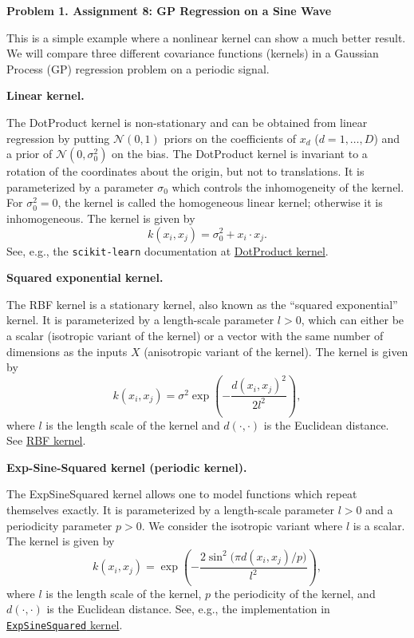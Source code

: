 \documentclass[11pt]{article}
\begin{document}
	
	\noindent\textbf{Problem 1. Assignment 8: GP Regression on a Sine Wave}
	
	This is a simple example where a nonlinear kernel can show a much better result. We will compare three different covariance functions (kernels) in a Gaussian Process (GP) regression problem on a periodic signal.
	
	\medskip
	\noindent\textbf{Linear kernel.}
	
	The DotProduct kernel is non-stationary and can be obtained from linear
	regression by putting $\mathcal{N}(0, 1)$ priors on the coefficients
	of $x_d$ ($d = 1, \dots, D$) and a prior of $\mathcal{N}(0, \sigma_0^2)$
	on the bias. The DotProduct kernel is invariant to a rotation of
	the coordinates about the origin, but not to translations.
	It is parameterized by a parameter $\sigma_0$
	which controls the inhomogeneity of the kernel. For $\sigma_0^2 = 0$,
	the kernel is called the homogeneous linear kernel; otherwise
	it is inhomogeneous. The kernel is given by
	\[
	k(x_i, x_j) = \sigma_0^{2} + x_i \cdot x_j.
	\]
	See, e.g., the \texttt{scikit-learn} documentation at
	\href{https://scikit-learn.org/stable/modules/generated/sklearn.gaussian_process.kernels.DotProduct.html}{DotProduct kernel}.
	
	\medskip
	\noindent\textbf{Squared exponential kernel.}
	
	The RBF kernel is a stationary kernel, also known as the
	``squared exponential'' kernel. It is parameterized by a length-scale
	parameter $l > 0$, which can either be a scalar (isotropic variant of the kernel) or a vector with the same number of dimensions as the inputs
	$X$ (anisotropic variant of the kernel). The kernel is given by
	\[
	k(x_i, x_j)
	= \sigma^2 \exp\!\left(
	- \frac{d(x_i, x_j)^2}{2l^2}
	\right),
	\]
	where $l$ is the length scale of the kernel and $d(\cdot,\cdot)$ is the Euclidean distance.
	See \href{https://scikit-learn.org/stable/modules/generated/sklearn.gaussian_process.kernels.RBF.html}{RBF kernel}.
	
	\medskip
	\noindent\textbf{Exp-Sine-Squared kernel (periodic kernel).}
	
	The ExpSineSquared kernel allows one to model functions which repeat
	themselves exactly. It is parameterized by a length-scale
	parameter $l > 0$ and a periodicity parameter $p > 0$. We consider the isotropic variant where $l$ is a scalar. The kernel is given by
	\[
	k(x_i, x_j)
	= \exp\!\left(
	-\frac{2\sin^2\!\bigl(\pi d(x_i, x_j)/p\bigr)}{l^2}
	\right),
	\]
	where $l$ is the length scale of the kernel, $p$ the periodicity of the kernel, and $d(\cdot,\cdot)$ is the Euclidean distance.
	See, e.g., the implementation in
	\href{https://github.com/scikit-learn/scikit-learn/blob/46a7c9a5e/sklearn/gaussian_process/kernels.py\#L1954}{\texttt{ExpSineSquared} kernel}.
	
\end{document}
